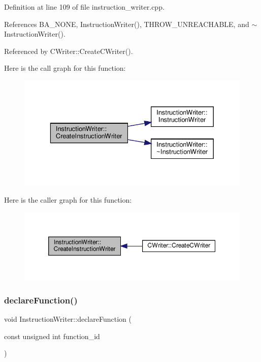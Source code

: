 Definition at line 109 of file instruction\+\_\+writer.\+cpp.



References B\+A\+\_\+\+N\+O\+NE, Instruction\+Writer(), T\+H\+R\+O\+W\+\_\+\+U\+N\+R\+E\+A\+C\+H\+A\+B\+LE, and $\sim$\+Instruction\+Writer().



Referenced by C\+Writer\+::\+Create\+C\+Writer().

Here is the call graph for this function\+:
\nopagebreak
\begin{figure}[H]
\begin{center}
\leavevmode
\includegraphics[width=329pt]{d3/d00/classInstructionWriter_a128b0f63616c37f0442cd1977d40f63c_cgraph}
\end{center}
\end{figure}
Here is the caller graph for this function\+:
\nopagebreak
\begin{figure}[H]
\begin{center}
\leavevmode
\includegraphics[width=350pt]{d3/d00/classInstructionWriter_a128b0f63616c37f0442cd1977d40f63c_icgraph}
\end{center}
\end{figure}
\mbox{\label{classInstructionWriter_adb886a6fe469c8b1142c63ee31c4a2f1}} 
\subsubsection{\texorpdfstring{declare\+Function()}{declareFunction()}}
{\footnotesize\ttfamily void Instruction\+Writer\+::declare\+Function (\begin{DoxyParamCaption}\item[{const unsigned int}]{function\+\_\+id }\end{DoxyParamCaption})\hspace{0.3cm}{\ttfamily [virtual]}}



